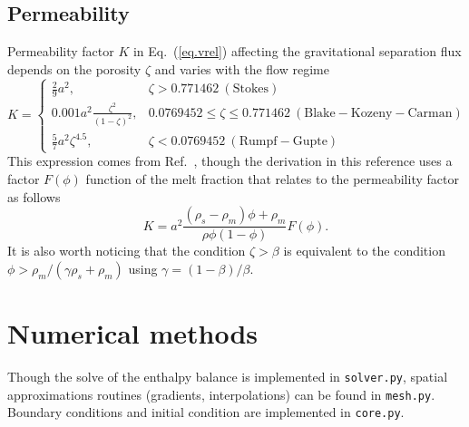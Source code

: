 \documentclass{article}
\begin{document}
\subsection{Permeability}
Permeability factor $K$ in Eq.~(\ref{eq.vrel}) affecting the gravitational separation flux depends on the porosity $\zeta$ and varies with the flow regime
\begin{equation}
K=\begin{cases}
    \frac{2}{9}a^2, & \zeta > 0.771462~\mathrm{(Stokes)} \\
    0.001 a^2\frac{\zeta^2}{(1-\zeta)^2}, & 0.0769452 \leq \zeta \leq 0.771462~\mathrm{(Blake-Kozeny-Carman)}\\
    \frac{5}{7}a^2 \zeta^{4.5}, & \zeta < 0.0769452~\mathrm{(Rumpf-Gupte)}
\end{cases}
\end{equation}
This expression comes from Ref.~\cite{ABE93}, though the derivation in this reference uses a factor $F(\phi)$ function of the melt fraction that relates to the permeability factor as follows 
\begin{equation}
    K = a^2\frac{(\rho_s-\rho_m)\phi + \rho_m}{\rho\phi(1-\phi)}F(\phi).
\end{equation}
It is also worth noticing that the condition $\zeta > \beta$ is equivalent to the condition $\phi > \rho_m/(\gamma \rho_s + \rho_m)$ using $\gamma = (1-\beta)/\beta$.

\section{Numerical methods}

Though the solve of the enthalpy balance is implemented in \texttt{solver.py}, spatial approximations routines (gradients, interpolations) can be found in \texttt{mesh.py}. Boundary conditions and initial condition are implemented in \texttt{core.py}.
\end{document}
